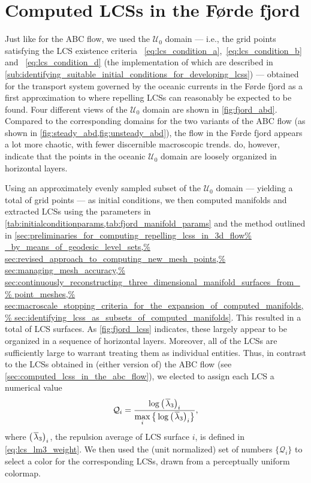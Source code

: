 \section{Computed LCSs in the Førde fjord}
\label{sec:computed_lcss_in_the_forde_fjord}

Just like for the ABC flow, we used the $\mathcal{U}_{0}$ domain --- i.e.,
the grid points satisfying the LCS existence criteria~
\eqref{eq:lcs_condition_a},~\eqref{eq:lcs_condition_b} and~
\eqref{eq:lcs_condition_d} (the implementation of which are described in
\cref{sub:identifying_suitable_initial_conditions_for_developing_lcss}) ---
obtained for the transport system governed by the oceanic currents in the
Førde fjord as a first approximation to where repelling LCSs can reasonably
be expected to be found. Four different views of the $\mathcal{U}_{0}$ domain
are shown in \cref{fig:fjord_abd}. Compared to the corresponding domains
for the two variants of the ABC flow (as shown in
\cref{fig:steady_abd,fig:unsteady_abd}), the flow in the Førde fjord appears
a lot more chaotic, with fewer discernible macroscopic trends.
 do, however, indicate that the
points in the oceanic $\mathcal{U}_{0}$ domain are loosely organized
in horizontal layers.



Using an approximately evenly sampled subset of the $\mathcal{U}_{0}$ domain
--- yielding a total of  grid points --- as initial conditions,
we then computed manifolds and extracted LCSs using the parameters
in \cref{tab:initialconditionparams,tab:fjord_manifold_params} and the method
outlined in \cref{sec:preliminaries_for_computing_repelling_lcss_in_3d_flow%
    _by_means_of_geodesic_level_sets,%
    sec:revised_approach_to_computing_new_mesh_points,%
    sec:managing_mesh_accuracy,%
    sec:continuously_reconstructing_three_dimensional_manifold_surfaces_from_%
    point_meshes,%
    sec:macroscale_stopping_criteria_for_the_expansion_of_computed_manifolds,%
    sec:identifying_lcss_as_subsets_of_computed_manifolds}. This resulted in
a total of  LCS surfaces. As \cref{fig:fjord_lcss} indicates,
these largely appear to be organized in a sequence of horizontal layers.
Moreover, all of the LCSs are sufficiently large to warrant treating them
as individual entities. Thus, in contrast to the LCSs obtained in (either
version of) the ABC flow (see \cref{sec:computed_lcss_in_the_abc_flow}), we
elected to assign each LCS a numerical value
\begin{equation}
    \label{eq:fjord_lcs_colorscaling}
    \mathcal{Q}_{i} = %
    \frac{\log{{\big({\mkern2mu}\overline{\lambda}_{3}\big)}_{i}}}%
    {\max\limits_{i}%
    \big\{\log{{\big({\mkern2mu}\overline{\lambda}_{3}\big)}_{i}}\big\}},
\end{equation}
where ${\big({\mkern2mu}\overline{\lambda}_{3}}\big)_{i}$, the repulsion
average of LCS surface $i$, is defined in \cref{eq:lcs_lm3_weight}. We then
used the (unit normalized) set of numbers $\big\{\mathcal{Q}_{i}\big\}$ to
select a color for the corresponding LCSs, drawn from a perceptually uniform
colormap.

